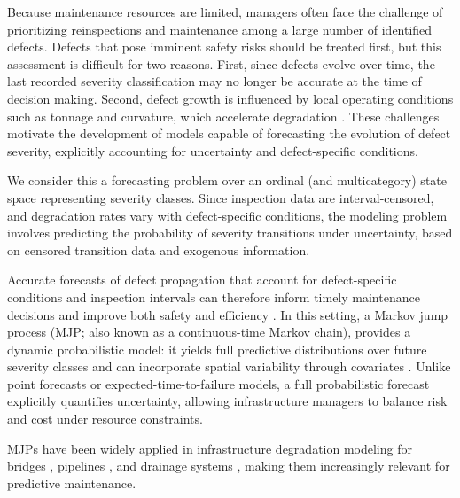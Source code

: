 Because maintenance resources are limited, managers often face the challenge of prioritizing reinspections and maintenance among a large number of identified defects.
Defects that pose imminent safety risks should be treated first, but this assessment is difficult for two reasons. 
First, since defects evolve over time, the last recorded severity classification may no longer be accurate at the time of decision making.
Second, defect growth is influenced by local operating conditions such as tonnage and curvature, which accelerate degradation \citep{bai2017a,Kumar2008HolisticSweden}.
These challenges motivate the development of models capable of forecasting the evolution of defect severity, explicitly accounting for uncertainty and defect-specific conditions.

We consider this a forecasting problem over an ordinal (and multicategory) state space representing severity classes. Since inspection data are interval-censored, and degradation rates vary with defect-specific conditions, the modeling problem involves predicting the probability of severity transitions under uncertainty, based on censored transition data and exogenous information.

Accurate forecasts of defect propagation that account for defect-specific conditions and inspection intervals can therefore inform timely maintenance decisions and improve both safety and efficiency \citep{Binder2023}. In this setting, a Markov jump process (MJP; also known as a continuous-time Markov chain), provides a dynamic probabilistic model: it yields full predictive distributions over future severity classes and can incorporate spatial variability through covariates \citep{bisgaard2024A}. Unlike point forecasts or expected-time-to-failure models, a full probabilistic forecast explicitly quantifies uncertainty, allowing infrastructure managers to balance risk and cost under resource constraints.

MJPs have been widely applied in infrastructure degradation modeling for bridges \citep{Mizutani2023RegimeSwitching}, pipelines \citep{JimenezRoa2024Nonhomogeneous}, and drainage systems \citep{Wu2021ConditionPrediction}, making them increasingly relevant for predictive maintenance. %

